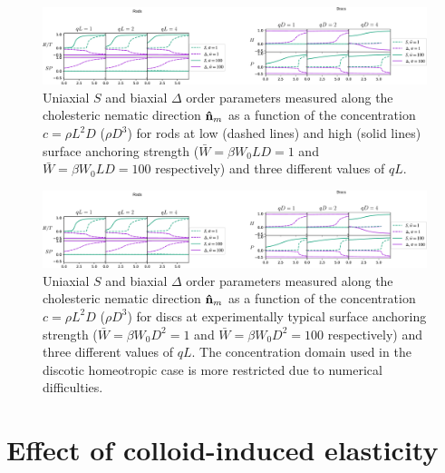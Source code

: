    \begin{figure}
	\includegraphics[width = \columnwidth]{figures/chapter-4/ordervsc_rods}
	\caption{ Uniaxial $S$ and biaxial $\Delta$ order parameters measured along the cholesteric nematic direction ${\bf \hat{n}}_{m}$ as a function of the concentration $c = \rho L^{2}D$ ($\rho D^{3}$) for rods at low (dashed lines) and high (solid lines) surface anchoring strength ($\bar{W} = \beta W_{0}LD = 1$ and $\bar{W} = \beta W_{0}LD = 100$ respectively) and three different values of $qL$.}
	\label{w1o}
\end{figure}

   \begin{figure}
	\includegraphics[width = \columnwidth]{figures/chapter-4/ordervsc_discs}
	\caption{ Uniaxial $S$ and biaxial $\Delta$ order parameters measured along the cholesteric nematic direction ${\bf \hat{n}}_{m}$ as a function of the concentration $c = \rho L^{2}D$ ($\rho D^{3}$) for discs at experimentally typical surface anchoring strength ($\bar{W} = \beta W_{0}D^2 = 1$ and $\bar{W} = \beta W_{0}D^2 = 100$ respectively) and three different values of $qL$.  The concentration domain used in the discotic homeotropic case is more restricted due to  numerical difficulties.}
	\label{w100o}
\end{figure}




\section{Effect of colloid-induced elasticity}

